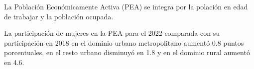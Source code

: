 La Población Económicamente Activa (PEA) se integra por la polación en edad de trabajar y la población ocupada. 

La participación de mujeres en la PEA para el 2022 comparada con su participación en 2018 en el dominio urbano metropolitano aumentó 0.8 puntos porcentuales, en el resto urbano disminuyó en 1.8 y en el dominio rural aumentó en 4.6.

